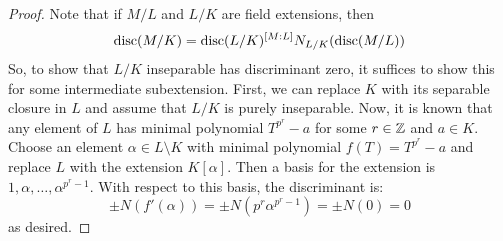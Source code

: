 \begin{proof}
	Note that if $M/L$ and $L/K$ are field extensions, then
	\[ \operatorname{disc}(M/K) = \operatorname{disc}(L/K)^{[M:L]}N_{L/K}(\operatorname{disc}(M/L)) \]
	So, to show that $L/K$ inseparable has discriminant zero, it suffices to show this for some intermediate subextension. First, we can replace $K$ with its separable closure in $L$ and assume that $L/K$ is purely inseparable. Now, it is known that any element of $L$ has minimal polynomial $T^{p^r}-a$ for some $r \in \mathbb{Z}$ and $a \in K$. Choose an element $\alpha \in L \setminus K$ with minimal polynomial $f(T) = T^{p^r}-a$ and replace $L$ with the extension $K[\alpha]$. Then a basis for the extension is $1,\alpha,\ldots,\alpha^{p^r-1}$. With respect to this basis, the discriminant is:
	\[ \pm N(f'(\alpha)) = \pm N(p^r\alpha^{p^r-1}) = \pm N(0) = 0 \]
	as desired.
\end{proof}
